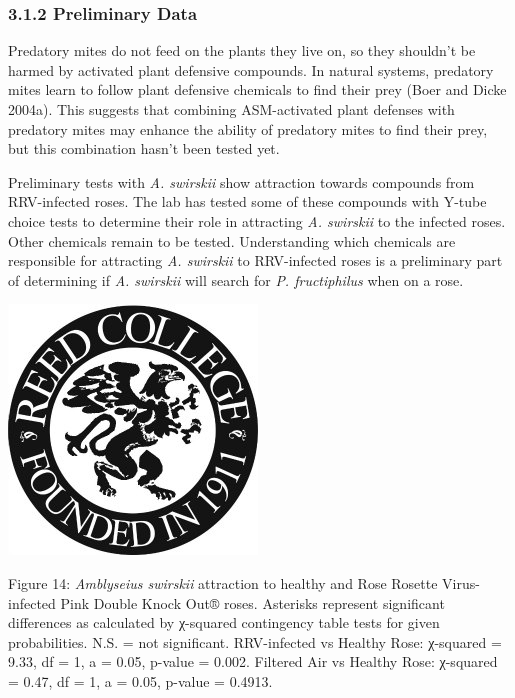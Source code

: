 \documentclass[12pt,final,CPage]{ufthesis}
\begin{document}
{  \hypertarget{preliminary-data}{%
  \subsubsection{3.1.2 Preliminary Data}\label{preliminary-data}}

  Predatory mites do not feed on the plants they live on, so they shouldn't be harmed by activated plant defensive compounds. In natural systems, predatory mites learn to follow plant defensive chemicals to find their prey (Boer and Dicke 2004a). This suggests that combining ASM-activated plant defenses with predatory mites may enhance the ability of predatory mites to find their prey, but this combination hasn't been tested yet.

  Preliminary tests with \emph{A. swirskii} show attraction towards compounds from RRV-infected roses. The lab has tested some of these compounds with Y-tube choice tests to determine their role in attracting \emph{A. swirskii} to the infected roses. Other chemicals remain to be tested. Understanding which chemicals are responsible for attracting \emph{A. swirskii} to RRV-infected roses is a preliminary part of determining if \emph{A. swirskii} will search for \emph{P. fructiphilus} when on a rose.
  \begin{center}\includegraphics[width=0.8\linewidth]{figure/reed} \end{center}

  Figure 14: \emph{Amblyseius swirskii} attraction to healthy and Rose Rosette Virus-infected Pink Double Knock Out® roses. Asterisks represent significant differences as calculated by χ-squared contingency table tests for given probabilities. N.S. = not significant. RRV-infected vs Healthy Rose: χ-squared = 9.33, df = 1, a = 0.05, p-value = 0.002. Filtered Air vs Healthy Rose: χ-squared = 0.47, df = 1, a = 0.05, p-value = 0.4913.

}
\end{document}
